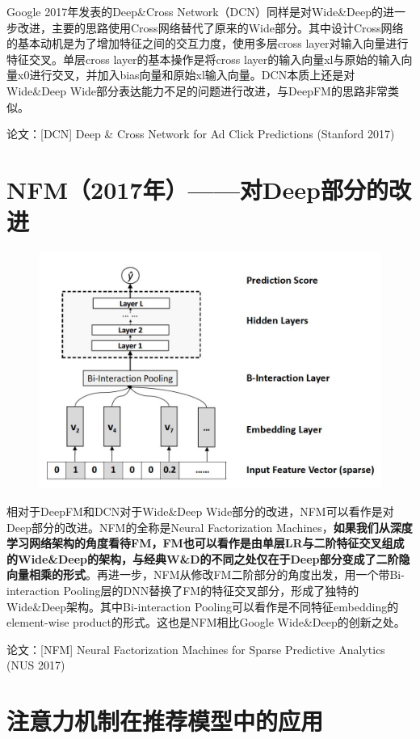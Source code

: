 \documentclass[12pt]{article}
\begin{document}
Google 2017年发表的Deep\&Cross Network（DCN）同样是对Wide\&Deep的进一步改进，主要的思路使用Cross网络替代了原来的Wide部分。其中设计Cross网络的基本动机是为了增加特征之间的交互力度，使用多层cross layer对输入向量进行特征交叉。单层cross layer的基本操作是将cross layer的输入向量xl与原始的输入向量x0进行交叉，并加入bias向量和原始xl输入向量。DCN本质上还是对Wide\&Deep Wide部分表达能力不足的问题进行改进，与DeepFM的思路非常类似。

论文：[DCN] Deep \& Cross Network for Ad Click Predictions (Stanford 2017)

\section{NFM（2017年）——对Deep部分的改进}
\begin{figure}[H]
    \centering
    \includegraphics[width=.8\textwidth]{fig/NFM_Structure.jpg}
\end{figure}

相对于DeepFM和DCN对于Wide\&Deep Wide部分的改进，NFM可以看作是对Deep部分的改进。NFM的全称是Neural Factorization Machines，\textbf{如果我们从深度学习网络架构的角度看待FM，FM也可以看作是由单层LR与二阶特征交叉组成的Wide\&Deep的架构，与经典W\&D的不同之处仅在于Deep部分变成了二阶隐向量相乘的形式}。再进一步，NFM从修改FM二阶部分的角度出发，用一个带Bi-interaction Pooling层的DNN替换了FM的特征交叉部分，形成了独特的Wide\&Deep架构。其中Bi-interaction Pooling可以看作是不同特征embedding的element-wise product的形式。这也是NFM相比Google Wide\&Deep的创新之处。

论文：[NFM] Neural Factorization Machines for Sparse Predictive Analytics (NUS 2017)

\section{注意力机制在推荐模型中的应用}
\end{document}
